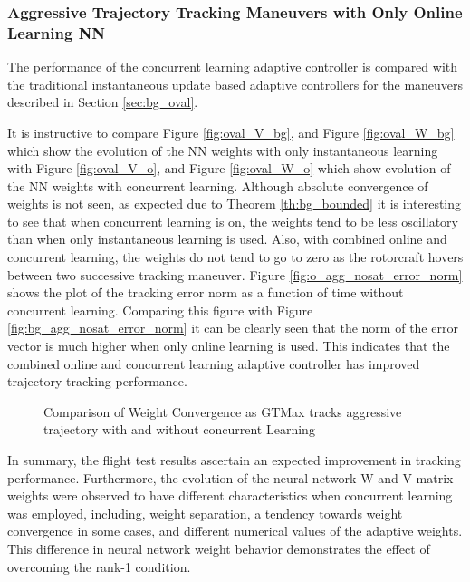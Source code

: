 \subsubsection{Aggressive Trajectory Tracking Maneuvers with Only Online Learning NN}
The performance of the concurrent learning adaptive controller is compared with the traditional instantaneous update based adaptive controllers for the maneuvers described in Section \ref{sec:bg_oval}.

It is instructive to compare Figure \ref{fig:oval_V_bg}, and Figure \ref{fig:oval_W_bg} which show the evolution of the NN weights with only instantaneous learning with Figure \ref{fig:oval_V_o}, and Figure \ref{fig:oval_W_o} which show evolution of the NN weights with concurrent learning. Although absolute convergence of weights is not seen, as expected due to Theorem \ref{th:bg_bounded} it is interesting to see that when concurrent learning is on, the weights tend to be less oscillatory than when only instantaneous learning is used. Also, with combined online and concurrent learning, the weights do not tend to go to zero as the rotorcraft hovers between two successive tracking maneuver. Figure \ref{fig:o_agg_nosat_error_norm} shows the plot of the tracking error norm as a function of time without concurrent learning. Comparing this figure with Figure \ref{fig:bg_agg_nosat_error_norm} it can be clearly seen that the norm of the error vector is much higher when only online learning is used. This indicates that the combined online and concurrent learning adaptive controller has improved trajectory tracking performance.
\begin{figure}[h]
\centering
{}
\caption{Comparison of Weight Convergence as GTMax tracks aggressive trajectory with and without concurrent Learning }
\label{fig:oval_weights}
\end{figure}
In summary, the flight test results ascertain an expected improvement in tracking performance.  Furthermore, the evolution of the neural network W and V matrix weights were observed to have different characteristics when concurrent learning was employed, including, weight separation, a tendency towards weight convergence in some cases, and different numerical values of the adaptive weights. This difference in neural network weight behavior demonstrates the effect of overcoming the rank-1 condition.

